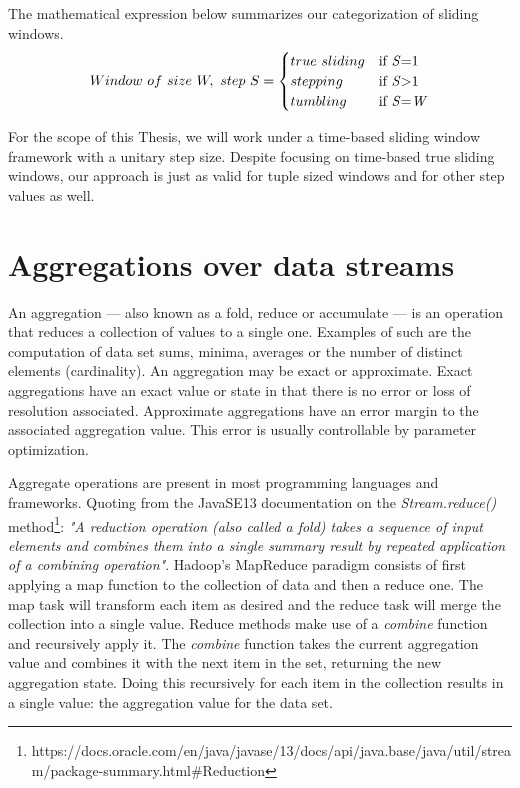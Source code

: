 The mathematical expression below summarizes our categorization of sliding windows.
\begin{equation} 
  Window \,\, of \,\, size \,\, W, \,\, step \,\, S =
    \begin{cases}
      true \,\, sliding & \text{if \textit{S}=1}\\
      stepping & \text{if \textit{S}>1}\\
      tumbling & \text{if \textit{S}=\textit{W}}
    \end{cases}
\end{equation}

For the scope of this Thesis, we will work under a time-based sliding window framework with a unitary step size. Despite focusing on time-based true sliding windows, our approach is just as valid for tuple sized windows and for other step values as well.

\section{Aggregations over data streams} \label{sec:aggregations}

An aggregation --- also known as a fold, reduce or accumulate --- is an operation that reduces a collection of values to a single one. Examples of such are the computation of data set sums, minima, averages or the number of distinct elements (cardinality). An aggregation may be exact or approximate. Exact aggregations have an exact value or state in that there is no error or loss of resolution associated. Approximate aggregations have an error margin to the associated aggregation value. This error is usually controllable by parameter optimization.

Aggregate operations are present in most programming languages and frameworks. Quoting from the JavaSE13 documentation on the \textit{Stream.reduce()} method\footnote{https://docs.oracle.com/en/java/javase/13/docs/api/java.base/java/util/stream/package-summary.html\#Reduction}: \textit{"A reduction operation (also called a fold) takes a sequence of input elements and combines them into a single summary result by repeated application of a combining operation"}. Hadoop's MapReduce paradigm consists of first applying a map function to the collection of data and then a reduce one. The map task will transform each item as desired and the reduce task will merge the collection into a single value. Reduce methods make use of a \textit{combine} function and recursively apply it. The \textit{combine} function takes the current aggregation value and combines it with the next item in the set, returning the new aggregation state. Doing this recursively for each item in the collection results in a single value: the aggregation value for the data set.

